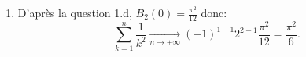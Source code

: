 \begin{enumerate}
\begin{enumerate}
           \item D'après la question 1.d, $B_{2}(0) = \displaystyle{\frac{\pi^{2}}{12}}$ donc:
           \[ \sum_{k=1}^{n}\frac{1}{k^{2}} \xrightarrow[n\to + \infty]{}(-1)^{1-1}2^{2-1}\frac{\pi^{2}}{12} = \frac{\pi^{2}}{6}.\]
          \end{enumerate}


\end{enumerate}

